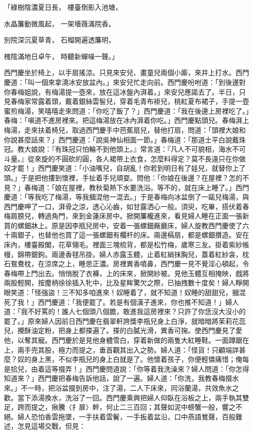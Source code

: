 「綠樹陰濃夏日長，  樓臺倒影入池塘，

水晶簾動微風起，  一架墻薇滿院香。

別院深沉夏草青，  石榴開遍透簾明，

槐陰滿地日卓午，  時聽新蟬噪一聲。」

西門慶坐於椅上，以手扇搖涼。只見來安兒、畫童兒兩個小廝，來井上打水。西門慶道：「叫一個來拿澆冰安放盆內。」來安兒忙走向前。西門慶吩咐道：「到後邊對你春梅姐說，有梅湯提一壺來，放在這冰盤內湃着。」來安兒應諾去了。半日，只見春梅家常露着頭，戴着銀絲雲髻兒，穿着毛青布褂兒，桃紅夏布裙子，手提一壺蜜煎梅湯，笑嘻嘻走來問道：「你吃了飯了？」西門慶道：「我在後邊上房裡吃了。」春梅：「嗔道不進房裡來。把這梅湯放在冰內湃着你吃。」西門慶點頭兒。春梅湃上梅湯，走來扶着椅兒，取過西門慶手中芭蕉扇兒，替他打扇，問道：「頭裡大娘和你說甚麼話來？」西門慶道：「說吳神仙相面一節。」春梅道：「那道士平白說戴珠冠。教大娘說：『有珠冠只怕輪不到他頭上。』常言道：『凡人不可貌相，海水不可斗量。』從來旋的不圓砍的圓，各人裙帶上衣食，怎麼料得定？莫不長遠只在你做奴才罷！」西門慶笑道：「小油嘴兒，自胡亂！你若到明日有了娃兒，就替你上了頭。」于是把他摟到懷裡，手扯着手兒頑耍。問他：「你娘在後邊？在屋裡？怎的不見？」春梅道：「娘在屋裡，教秋菊熱下水要洗浴。等不的，就在床上睡了。」西門慶道：「等我吃了梅湯，等我摑混他一混去。」于是春梅向冰盆倒了一甌兒梅湯，與西門慶呷了一口，湃骨之涼，透心沁齒，如甘露洒心一般。須臾，吃畢，搭伏着春梅肩膀兒，轉過角門，來到金蓮床房中。掀開簾櫳進來，看見婦人睡在正面一張新買的螺鈿牀上。原是因李瓶兒房中，安着一張螺鈿厰廳床，婦人旋教西門慶使了六十兩銀子，也替他也買了這一張螺鈿有欄杆的床。兩邊槅扇，都是螺鈿攢造。安在床內，樓臺殿閣，花草翎毛。裡面三塊梳背，都是松竹梅，歲寒三友。掛着紫紗帳幔，錦帶銀鉤。兩邊香毬吊掛。婦人赤露玉體，止着紅綃抹胸兒，蓋着紅紗衾，枕石鴛鴦枕，在涼席之上，睡思正濃。房裡異香噴鼻，西門慶一見不覺淫心頓起，令春梅帶上門出去。悄悄脫了衣褲，上的床來，掀開紗被。見他玉體互相掩映，戲將兩股輕開，按塵柄徐徐插入牝中，比及星眸驚欠之際，已抽拽數十度矣！婦人睜開眼笑道：「怪強盜！三不知多咱進來！奴睡着了，就不知道！奴睡的甜甜兒，摑混死了我！」西門慶道：「我便罷了。若是有個漢子進來，你也推不知道！」婦人道：「我不好罵的！誰人七個頭八個膽，敢進我這房裡來？只許了你恁沒大沒小的罷了。」原來婦人因前日西門慶在翡翠軒誇獎李瓶兒身上白淨，就暗暗將茉莉花蕊兒，攪酥油定粉，把身上都搽遍了。搽的白膩光滑，異香可掬。使西門慶見了愛他，以奪其寵。西門慶於是見他身體雪白，穿着新做的兩隻大紅睡鞋。一面蹲踞在上，兩手兜其股，極力而提之，垂首觀其出入之勢。婦人道：「怪貨！只顧端詳甚麼？奴的身上黑，不似李瓶兒的身上白就是了。他懷着孩子，你便輕憐痛惜；俺每是拾兒，由着這等掇弄！」西門慶問道說：「你等着我洗澡來？婦人問道：「你怎得知道來？」西門慶把春梅告訴他話，說了一遍。婦人道：「你洗，我教春梅掇水來。」不一時，把浴盆掇到房中，注了湯，二人下床來，同浴蘭湯，共效魚水之歡。當下添湯換水，洗浴了一回。西門慶乘興把婦人仰臥在浴板之上，兩手執其雙足，跨而提之，揪騰〈扌扉〉幹，何止二三百回；其聲如泥中螃蟹一般，響之不絕。婦人恐怕香雲拖墜，一手扶着雲鬢，一手扳着盆沿，口中燕語鶯聲，百般難述，怎見這場交戰，但見：

